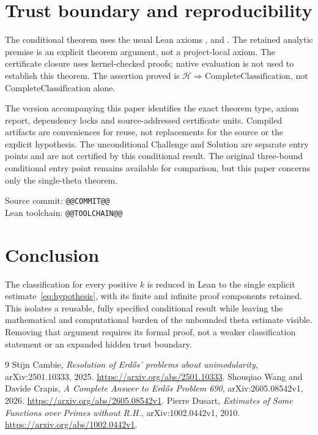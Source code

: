 \documentclass[11pt]{amsart}
\theoremstyle{definition}
\newcommand{\code}[1]{\path{#1}}
\begin{document}
\section{Trust boundary and reproducibility}
The conditional theorem uses the usual Lean axioms
\code{propext}, \code{Classical.choice} and \code{Quot.sound}.
The retained analytic premise is an explicit theorem argument, not a
project-local axiom. The certificate closure uses kernel-checked proofs;
native evaluation is not used to establish this theorem. The assertion
proved is $\mathcal H\Rightarrow\mathrm{CompleteClassification}$, not
$\mathrm{CompleteClassification}$ alone.

The version accompanying this paper identifies the exact theorem type,
axiom report, dependency locks and source-addressed certificate units.
Compiled artifacts are conveniences for reuse, not replacements for the
source or the explicit hypothesis. The unconditional Challenge and Solution
are separate entry points and are not certified by this conditional result.
The original three-bound conditional entry point remains available for
comparison, but this paper concerns only the single-theta theorem.

\begin{center}\small
Source commit: \texttt{@@COMMIT@@}\\
Lean toolchain: \texttt{@@TOOLCHAIN@@}
\end{center}

\section{Conclusion}
The classification for every positive $k$ is reduced in Lean to the single
explicit estimate~\eqref{eq:hypothesis}, with its finite and infinite proof
components retained. This isolates a reusable, fully specified conditional
result while leaving the mathematical and computational burden of the
unbounded theta estimate visible. Removing that argument requires its
formal proof, not a weaker classification statement or an expanded hidden
trust boundary.

\begin{thebibliography}{9}
 Stijn Cambie, \emph{Resolution of Erd\H{o}s' problems about
unimodularity}, arXiv:2501.10333, 2025.
\url{https://arxiv.org/abs/2501.10333}.
 Shouqiao Wang and Davide Crapis,
\emph{A Complete Answer to Erd\H{o}s Problem 690}, arXiv:2605.08542v1, 2026.
\url{https://arxiv.org/abs/2605.08542v1}.
 Pierre Dusart, \emph{Estimates of Some Functions over Primes
without R.H.}, arXiv:1002.0442v1, 2010.
\url{https://arxiv.org/abs/1002.0442v1}.
\end{thebibliography}
\end{document}
